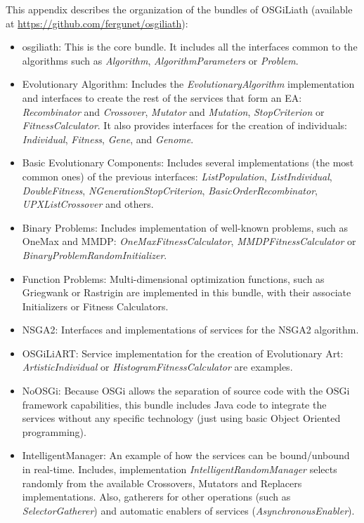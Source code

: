 \label{chap:appendixosgiliath}
\minitoc\mtcskip
\vfill



This appendix describes the organization of the bundles of OSGiLiath (available at \url{https://github.com/fergunet/osgiliath}):

\begin{itemize}
\item osgiliath: This is the core bundle. It includes all the interfaces common to the algorithms such as {\em Algorithm}, {\em AlgorithmParameters} or {\em Problem}. 
\item Evolutionary Algorithm:  Includes the {\em EvolutionaryAlgorithm} implementation and interfaces to create the rest of the services that form an EA: {\em Recombinator} and {\em Crossover}, {\em Mutator} and {\em Mutation}, {\em StopCriterion} or {\em FitnessCalculator}. It also provides interfaces for the creation of individuals: {\em Individual}, {\em Fitness}, {\em Gene}, and {\em Genome}. 
\item Basic Evolutionary Components: Includes several implementations (the most common ones) of the previous interfaces: {\em ListPopulation}, {\em ListIndividual}, {\em DoubleFitness}, {\em NGe\-ne\-ra\-tion\-Stop\-Cri\-te\-rion}, {\em BasicOrderRecombinator}, {\em UPXListCrossover} and others.
\item Binary Problems: Includes implementation of well-known problems, such as OneMax and MMDP: {\em OneMaxFitnessCalculator}, {\em MMDPFitnessCalculator} or {\em BinaryProblemRandomInitializer}.
\item Function Problems: Multi-dimensional optimization functions, such as Griegwank or Rastrigin are implemented in this bundle, with their associate Initializers or Fitness Calculators.
\item NSGA2: Interfaces and implementations of services for the NSGA2 algorithm.
\item OSGiLiART: Service implementation for the creation of Evolutionary Art: {\em ArtisticIndividual} or {\em HistogramFitnessCalculator} are examples.
\item NoOSGi: Because OSGi allows the separation of source code with the OSGi framework capabilities, this bundle includes Java code to integrate the services without any specific technology (just using basic Object Oriented programming).
\item IntelligentManager: An example of how the services can be bound/unbound in real-time. Includes, implementation {\em IntelligentRandomManager} selects randomly from the available Crossovers, Mutators and Replacers implementations. Also, gatherers for other operations (such as {\em SelectorGatherer}) and automatic enablers of services ({\em AsynchronousEnabler}).
\end{itemize}